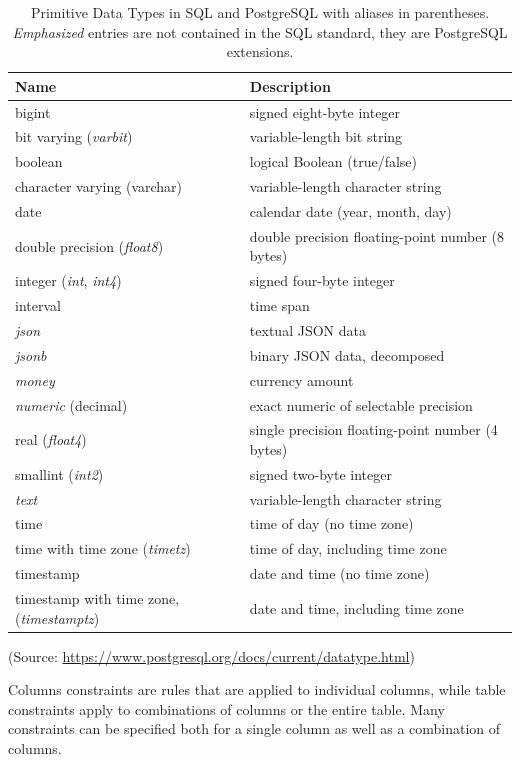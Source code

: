 \begin{table}
\renewcommand{\arraystretch}{1.25}
\begin{tabularx}{\linewidth}{l|X} \hline
\textbf{Name} & \textbf{Description} \\ \hline
bigint & signed eight-byte integer \\
bit varying (\emph{varbit}) &	variable-length bit string\\
boolean & logical Boolean (true/false)\\
character varying (varchar) & variable-length character string\\
date &	calendar date (year, month, day)\\
double precision (\emph{float8}) & double precision floating-point number (8 bytes)\\
integer (\emph{int}, \emph{int4}) &	signed four-byte integer\\
interval & time span\\
\emph{json} & 	textual JSON data\\
\emph{jsonb} &	binary JSON data, decomposed\\
\emph{money} & currency amount\\
\emph{numeric} (decimal) & exact numeric of selectable precision\\
real (\emph{float4}) & single precision floating-point number (4 bytes)\\
smallint (\emph{int2}) & signed two-byte integer\\
\emph{text} &	variable-length character string\\
time & time of day (no time zone)\\
time with time zone (\emph{timetz}) & time of day, including time zone\\
timestamp & date and time (no time zone)\\
timestamp with time zone, (\emph{timestamptz}) & date and time, including time zone\\ \hline
\end{tabularx}
 (\footnotesize Source: \url{https://www.postgresql.org/docs/current/datatype.html})
\caption[Primitive Data Types in SQL and PostgreSQL]{Primitive Data Types in SQL and PostgreSQL with aliases in parentheses. \emph{Emphasized} entries are not contained in the SQL standard, they are PostgreSQL extensions.}
\label{tab:datatypes}
\end{table}

Columns constraints are rules that are applied to individual columns, while table constraints apply to combinations of columns or the entire table. Many constraints can be specified both for a single column as well as a combination of columns. 

